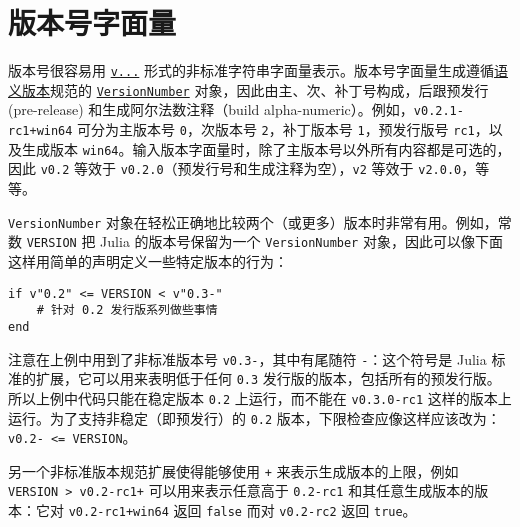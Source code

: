 \hypertarget{10038787961375920908}{}


\section{版本号字面量}



版本号很容易用 \hyperlink{8914616188788850763}{\texttt{v{\textquotedbl}...{\textquotedbl}}} 形式的非标准字符串字面量表示。版本号字面量生成遵循\href{https://semver.org/}{语义版本}规范的 \hyperlink{16653194174751393225}{\texttt{VersionNumber}} 对象，因此由主、次、补丁号构成，后跟预发行 (pre-release) 和生成阿尔法数注释（build alpha-numeric）。例如，\texttt{v{\textquotedbl}0.2.1-rc1+win64{\textquotedbl}} 可分为主版本号 \texttt{0}，次版本号 \texttt{2}，补丁版本号 \texttt{1}，预发行版号 \texttt{rc1}，以及生成版本 \texttt{win64}。输入版本字面量时，除了主版本号以外所有内容都是可选的，因此 \texttt{v{\textquotedbl}0.2{\textquotedbl}} 等效于 \texttt{v{\textquotedbl}0.2.0{\textquotedbl}}（预发行号和生成注释为空），\texttt{v{\textquotedbl}2{\textquotedbl}} 等效于 \texttt{v{\textquotedbl}2.0.0{\textquotedbl}}，等等。



\texttt{VersionNumber} 对象在轻松正确地比较两个（或更多）版本时非常有用。例如，常数 \texttt{VERSION} 把 Julia 的版本号保留为一个 \texttt{VersionNumber} 对象，因此可以像下面这样用简单的声明定义一些特定版本的行为：




\begin{verbatim}
if v"0.2" <= VERSION < v"0.3-"
    # 针对 0.2 发行版系列做些事情
end
\end{verbatim}



注意在上例中用到了非标准版本号 \texttt{v{\textquotedbl}0.3-{\textquotedbl}}，其中有尾随符 \texttt{-}：这个符号是 Julia 标准的扩展，它可以用来表明低于任何 \texttt{0.3} 发行版的版本，包括所有的预发行版。所以上例中代码只能在稳定版本 \texttt{0.2} 上运行，而不能在 \texttt{v{\textquotedbl}0.3.0-rc1{\textquotedbl}} 这样的版本上运行。为了支持非稳定（即预发行）的 \texttt{0.2} 版本，下限检查应像这样应该改为：\texttt{v{\textquotedbl}0.2-{\textquotedbl} <= VERSION}。



另一个非标准版本规范扩展使得能够使用 \texttt{+} 来表示生成版本的上限，例如 \texttt{VERSION > v{\textquotedbl}0.2-rc1+{\textquotedbl}} 可以用来表示任意高于 \texttt{0.2-rc1} 和其任意生成版本的版本：它对 \texttt{v{\textquotedbl}0.2-rc1+win64{\textquotedbl}} 返回 \texttt{false} 而对 \texttt{v{\textquotedbl}0.2-rc2{\textquotedbl}} 返回 \texttt{true}。



